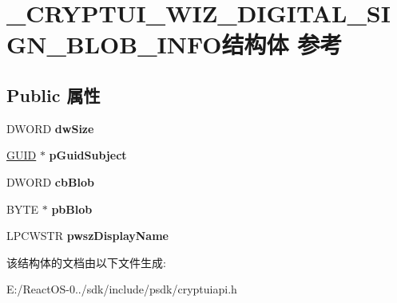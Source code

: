 \hypertarget{struct___c_r_y_p_t_u_i___w_i_z___d_i_g_i_t_a_l___s_i_g_n___b_l_o_b___i_n_f_o}{}\section{\+\_\+\+C\+R\+Y\+P\+T\+U\+I\+\_\+\+W\+I\+Z\+\_\+\+D\+I\+G\+I\+T\+A\+L\+\_\+\+S\+I\+G\+N\+\_\+\+B\+L\+O\+B\+\_\+\+I\+N\+F\+O结构体 参考}
\label{struct___c_r_y_p_t_u_i___w_i_z___d_i_g_i_t_a_l___s_i_g_n___b_l_o_b___i_n_f_o}
\subsection*{Public 属性}
\begin{DoxyCompactItemize}
\item 
\mbox{\label{struct___c_r_y_p_t_u_i___w_i_z___d_i_g_i_t_a_l___s_i_g_n___b_l_o_b___i_n_f_o_ade2a718ac5a9b603f91c969c04a4e2c3}} 
D\+W\+O\+RD {\bfseries dw\+Size}
\item 
\mbox{\label{struct___c_r_y_p_t_u_i___w_i_z___d_i_g_i_t_a_l___s_i_g_n___b_l_o_b___i_n_f_o_a317b016573f3876b07d667a7eb8f03aa}} 
\hyperlink{interface_g_u_i_d}{G\+U\+ID} $\ast$ {\bfseries p\+Guid\+Subject}
\item 
\mbox{\label{struct___c_r_y_p_t_u_i___w_i_z___d_i_g_i_t_a_l___s_i_g_n___b_l_o_b___i_n_f_o_a46083a77b50077b8480ca5af369f721c}} 
D\+W\+O\+RD {\bfseries cb\+Blob}
\item 
\mbox{\label{struct___c_r_y_p_t_u_i___w_i_z___d_i_g_i_t_a_l___s_i_g_n___b_l_o_b___i_n_f_o_a018a254774971b78ffb88234f9669c3b}} 
B\+Y\+TE $\ast$ {\bfseries pb\+Blob}
\item 
\mbox{\label{struct___c_r_y_p_t_u_i___w_i_z___d_i_g_i_t_a_l___s_i_g_n___b_l_o_b___i_n_f_o_a439f910ebc5b4feb7a265cf57cc7ff6b}} 
L\+P\+C\+W\+S\+TR {\bfseries pwsz\+Display\+Name}
\end{DoxyCompactItemize}


该结构体的文档由以下文件生成\+:\begin{DoxyCompactItemize}
\item 
E\+:/\+React\+O\+S-\/0../sdk/include/psdk/cryptuiapi.\+h\end{DoxyCompactItemize}
